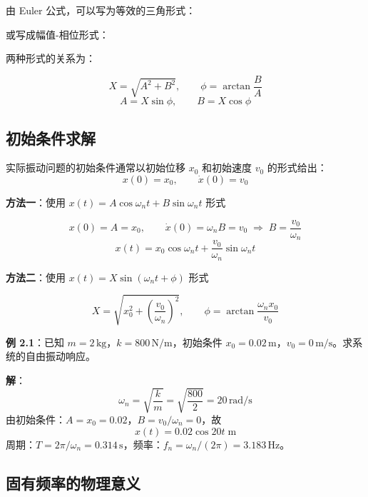由 Euler 公式，可以写为等效的三角形式：
\begin{myformula}
    \end{myformula}

或写成幅值-相位形式：
\begin{myformula}
    \end{myformula}

两种形式的关系为：
\begin{myformula}
    \[
    X = \sqrt{A^2 + B^2},\qquad \phi = \arctan\frac{B}{A}
    \]
    \[
    A = X\sin\phi,\qquad B = X\cos\phi
    \]
\end{myformula}

\subsection{初始条件求解}

实际振动问题的初始条件通常以初始位移 $x_0$ 和初始速度 $v_0$ 的形式给出：
\[
x(0) = x_0,\qquad \dot{x}(0) = v_0
\]

\textbf{方法一}：使用 $x(t) = A\cos\omega_n t + B\sin\omega_n t$ 形式
\begin{myformula}
    \[
    x(0) = A = x_0,\qquad \dot{x}(0) = \omega_n B = v_0 \;\Rightarrow\; B = \frac{v_0}{\omega_n}
    \]
    \[
    x(t) = x_0\cos\omega_n t + \frac{v_0}{\omega_n}\sin\omega_n t
    \]
\end{myformula}

\textbf{方法二}：使用 $x(t) = X\sin(\omega_n t + \phi)$ 形式
\begin{myformula}
    \[
    X = \sqrt{x_0^2 + \left(\frac{v_0}{\omega_n}\right)^2},\qquad
    \phi = \arctan\frac{\omega_n x_0}{v_0}
    \]
\end{myformula}

\textbf{例 2.1}：已知 $m = 2\,\text{kg}$，$k = 800\,\text{N/m}$，初始条件 $x_0 = 0.02\,\text{m}$，$v_0 = 0\,\text{m/s}$。求系统的自由振动响应。

\textbf{解}：
\[
\omega_n = \sqrt{\frac{k}{m}} = \sqrt{\frac{800}{2}} = 20\,\text{rad/s}
\]
由初始条件：$A = x_0 = 0.02$，$B = v_0/\omega_n = 0$，故
\[
x(t) = 0.02\cos 20t\;\text{m}
\]
周期：$T = 2\pi/\omega_n = 0.314\,\text{s}$，频率：$f_n = \omega_n/(2\pi) = 3.183\,\text{Hz}$。

\subsection{固有频率的物理意义}

